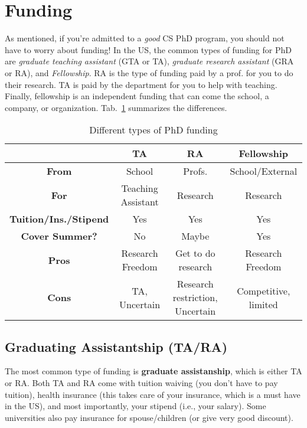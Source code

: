 \documentclass[11pt]{article}
\begin{document}
\section{Funding}\label{sec:funding}

As mentioned, if you're admitted to a \emph{good} CS PhD program, you should not have to worry about funding!  
In the US, the common types of funding for PhD are \emph{graduate teaching assistant} (GTA or TA), \emph{graduate research assistant} (GRA or RA), and \emph{Fellowship}.
RA is the type of funding paid by a prof. for you to do their research. TA is paid by the department for you to help with teaching. Finally, fellowship is an independent funding that can come the school, a company, or organization. Tab.~\ref{tab:funding} summarizes the differences. 

\begin{table}
  \centering
  \footnotesize
  \caption{Different types of PhD funding}\label{tab:funding}
  \begin{tabular}{c|c|c|c}
    \toprule
    &\textbf{TA}&\textbf{RA}&\textbf{Fellowship}\\
    \midrule
    \textbf{From} & School & Profs. & School/External\\
    \textbf{For}                  & Teaching Assistant       & Research                        & Research                              \\
    \textbf{Tuition/Ins./Stipend} & Yes                      & Yes                             & Yes                                   \\
    \textbf{Cover Summer?}              & No                       & Maybe                           & Yes                                   \\
    \midrule
    \textbf{Pros}                 & Research Freedom         & Get to do research              & Research Freedom                      \\
    \textbf{Cons}                 & TA, Uncertain            & Research restriction, Uncertain & Competitive, limited             \\
    \bottomrule
  \end{tabular}
\end{table}

\subsection{Graduating Assistantship (TA/RA)}
The most common type of funding is \textbf{graduate assistanship}, which is either TA or RA. Both TA and RA come with tuition waiving (you don't have to pay tuition), health insurance (this takes care of your insurance, which is a must have in the US), and most importantly, your stipend (i.e., your salary). Some universities also pay insurance for spouse/children (or give very good discount).
\end{document}
